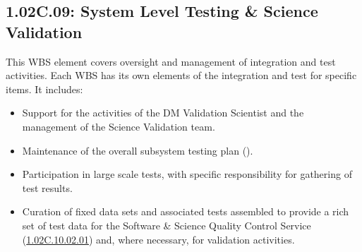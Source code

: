 \subsection*{1.02C.09: System Level Testing \& Science Validation}
\label{wbs:1.02C.09}

This WBS element covers oversight and management of integration and test activities. Each WBS has its own elements of the integration and test for specific items. It includes:

\begin{itemize}

\item{Support for the activities of the DM Validation Scientist and the
management of the Science Validation team.}

\item{Maintenance of the overall subsystem testing plan ().}

\item{Participation in large scale tests, with specific responsibility for
gathering of test results.}

\item{Curation of fixed data sets and associated tests assembled to provide a
rich set of test data for the Software \& Science Quality Control Service
(\hyperref[wbs:1.02C.10.02.01]{1.02C.10.02.01}) and, where necessary, for
validation activities.}


\end{itemize}



